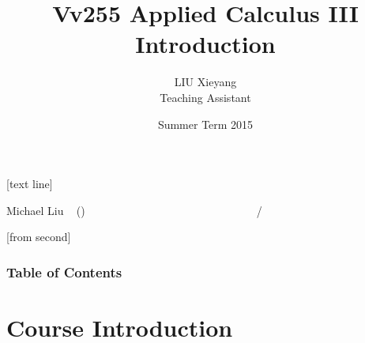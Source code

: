 \documentclass{beamer}
\begin{document}



[text line]{%
	\color{blue!40!black}\parbox{\linewidth}{\vspace*{-8pt}Michael Liu ~ (\insertshortinstitute)~~~~~~~~~~~~~~~~~~~~~~~~\insertshorttitle\hfill\insertshortdate~~~~~~\insertframenumber{}~/~\inserttotalframenumber}}


[from second] 

\newcommand{\tabincell}[2]{\begin{tabular}{@{}#1@{}}#2\end{tabular}}


\title[Vv255 Applied Calculus III]{Vv255 Applied Calculus III\\{\small Introduction}}   
\author[Michael Liu]{LIU Xieyang\\{\tiny Teaching Assistant}} 
\date[Summer 2015]{Summer Term 2015} 
\begin{frame}
	\titlepage
\end{frame}

\begin{frame}
	\frametitle{Table of Contents}
	\tableofcontents
\end{frame}





\section{Course Introduction} 
\end{document}
